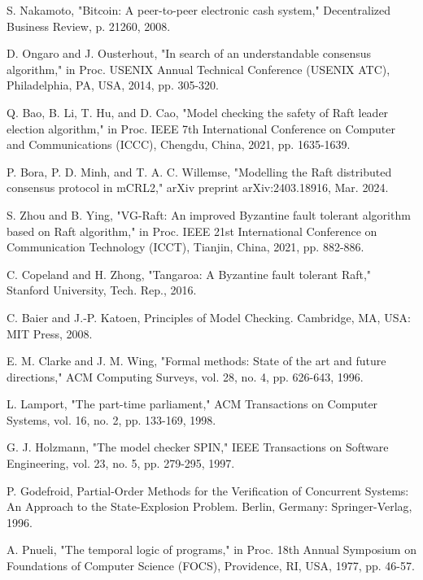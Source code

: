 \documentclass[a4paper]{llncs}
\begin{document}

\begin{thebibliography}{00}

 S. Nakamoto, "Bitcoin: A peer-to-peer electronic cash system," Decentralized Business Review, p. 21260, 2008.

 D. Ongaro and J. Ousterhout, "In search of an understandable consensus algorithm," in Proc. USENIX Annual Technical Conference (USENIX ATC), Philadelphia, PA, USA, 2014, pp. 305-320.

 Q. Bao, B. Li, T. Hu, and D. Cao, "Model checking the safety of Raft leader election algorithm," in Proc. IEEE 7th International Conference on Computer and Communications (ICCC), Chengdu, China, 2021, pp. 1635-1639.

 P. Bora, P. D. Minh, and T. A. C. Willemse, "Modelling the Raft distributed consensus protocol in mCRL2," arXiv preprint arXiv:2403.18916, Mar. 2024.

 S. Zhou and B. Ying, "VG-Raft: An improved Byzantine fault tolerant algorithm based on Raft algorithm," in Proc. IEEE 21st International Conference on Communication Technology (ICCT), Tianjin, China, 2021, pp. 882-886.

 C. Copeland and H. Zhong, "Tangaroa: A Byzantine fault tolerant Raft," Stanford University, Tech. Rep., 2016.

 C. Baier and J.-P. Katoen, Principles of Model Checking. Cambridge, MA, USA: MIT Press, 2008.

 E. M. Clarke and J. M. Wing, "Formal methods: State of the art and future directions," ACM Computing Surveys, vol. 28, no. 4, pp. 626-643, 1996.

 L. Lamport, "The part-time parliament," ACM Transactions on Computer Systems, vol. 16, no. 2, pp. 133-169, 1998.

 G. J. Holzmann, "The model checker SPIN," IEEE Transactions on Software Engineering, vol. 23, no. 5, pp. 279-295, 1997.

 P. Godefroid, Partial-Order Methods for the Verification of Concurrent Systems: An Approach to the State-Explosion Problem. Berlin, Germany: Springer-Verlag, 1996.

 A. Pnueli, "The temporal logic of programs," in Proc. 18th Annual Symposium on Foundations of Computer Science (FOCS), Providence, RI, USA, 1977, pp. 46-57.


\end{thebibliography}
\end{document}
